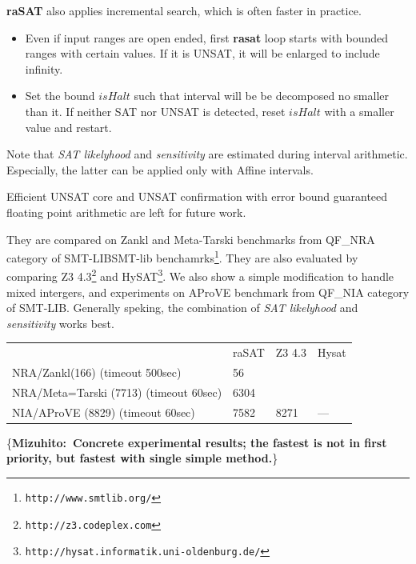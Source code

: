 \documentclass[runningheads,a4paper,oribibl]{llncs}
\newcommand{\mizuhito}[1]{\{{\bf Mizuhito:~\sf #1}\}} %
\begin{document}
{\bf raSAT} also applies incremental search, which is often faster in practice. 
\begin{itemize}
\item Even if input ranges are open ended, first {\bf rasat}
loop starts with bounded ranges with certain values. If it is UNSAT, it will be enlarged 
to include infinity. 
\item Set the bound $isHalt$ such that interval will be be decomposed no smaller 
than it. If neither SAT nor UNSAT is detected, reset $isHalt$ with a smaller value and restart. 
\end{itemize} 

Note that {\em SAT likelyhood} and {\em sensitivity} are estimated during interval arithmetic. 
Especially, the latter can be applied only with Affine intervals. 

Efficient UNSAT core and UNSAT confirmation with error bound guaranteed floating point arithmetic 
are left for future work. 

They are compared on Zankl and Meta-Tarski benchmarks from 
QF\_NRA category of SMT-LIBSMT-lib benchamrks\footnote{\tt http://www.smtlib.org/}. 
They are also evaluated by comparing 
Z3 4.3\footnote{\tt http://z3.codeplex.com} and 
HySAT\footnote{\tt http://hysat.informatik.uni-oldenburg.de/}. 
We also show a simple modification to handle mixed intergers, and experiments on 
AProVE benchmark from QF\_NIA category of SMT-LIB. 
Generally speking, the combination of {\em SAT likelyhood} and {\em sensitivity} works best. 

\begin{tabular}{llll}
                                       & raSAT & Z3 4.3 & Hysat \\
NRA/Zankl(166) (timeout 500sec)        & 56    &        &       \\
NRA/Meta=Tarski (7713) (timeout 60sec) & 6304  &        &       \\
NIA/AProVE (8829) (timeout 60sec)      & 7582  & 8271   & --- \\
 
\end{tabular}

\mizuhito{Concrete experimental results; the fastest is not in first priority, 
but fastest with single simple method.}

\end{document}
